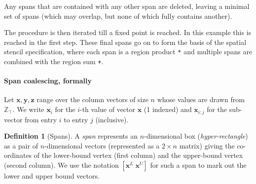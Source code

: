 \documentclass[9pt]{sigplanconf}
\newcounter{block}
\theoremstyle{definition}
\newtheorem{definition}[block]{Definition}
\newcommand{\vect}[1]{\textbf{#1}}
\begin{document}
%
Any spans that are contained with any other span are deleted,
leaving a minimal set of spans (which may overlap, but none of which
fully contains another).
\begin{center}
\end{center}
%
The procedure is then iterated till a fixed point is reached. In this
example this is reached in the first step. These final spans
go on to form the basis of the spatial stencil specification, where
each span is a region product \texttt{*} and multiple spans are
combined with the region sum \texttt{+}.


\paragraph{Span coalescing, formally}

Let $\vect{x}, \vect{y}, \vect{z}$ range over the column vectors of size
$n$ whose values are drawn from $\mathbb{Z}_\top$.
We write $\vect{x}_i$ for the $i$-th value of vector $\vect{x}$ (1
indexed) and $\vect{x}_{i:j}$ for the sub-vector from entry $i$ to
entry $j$ (inclusive).

\begin{definition}[Spans]
  A \emph{span} represents an $n$-dimensional box (\emph{hyper-rectangle}) as
  a pair of $n$-dimensional vectors (represented as a $2 \times n$
  matrix) giving the co-ordinates of the lower-bound vertex (first
  column) and the upper-bound vertex (second column). We use the
  notation $[\vect{x}^L \; \vect{x}^U]$ for such a span to mark out
  the lower and upper bound vectors.
\end{definition}
\end{document}
